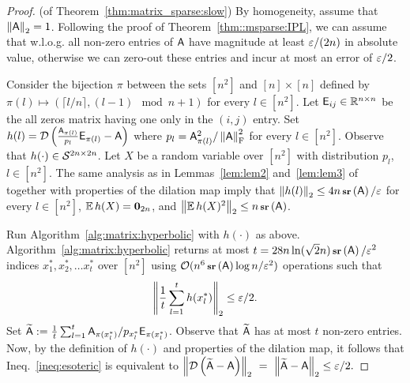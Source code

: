 \begin{proof}(of Theorem~\ref{thm:matrix_sparse:slow})
By homogeneity, assume that $\left\|{\mathsf{A} }\right\|_2 = 1$. Following the proof of Theorem~\ref{thm::msparse:IPL}, we can assume that w.l.o.g. all non-zero entries of ${\mathsf{A} }$ have magnitude at least $\varepsilon/(2n)$ in absolute value, otherwise we can zero-out these entries and incur at most an error of $\varepsilon/2$.
%

%
Consider the bijection $\pi$ between the sets $[n^2]$ and $[n]\times [n]$ defined by $\pi (l)  \mapsto ( \lceil l / n\rceil , (l - 1) \mod n + 1) $ for every $l\in[n^2]$. Let ${\mathsf{E} }_{ij}\in\mathbb{R}^{n\times n}$ be the all zeros matrix having one only in the $(i,j)$ entry. Set $h(l) = \mathcal{D}\left( \frac{{\mathsf{A} }_{\pi (l)}}{p_{l}} {\mathsf{E} }_{\pi (l)} - {\mathsf{A} } \right)$ where $p_l = {\mathsf{A} }_{\pi (l)}^2/\left\|{\mathsf{A} }\right\|_{\textrm{F}}^2$ for every $l\in{[n^2]}$. Observe that $h(\cdot ) \in \mathcal{S}^{2n\times 2n}$. Let $X$ be a random variable over $[n^2]$ with distribution $p_l$, $l\in{[n^2]}$. The same analysis as in Lemmas~\ref{lem:lem2} and~\ref{lem:lem3} of~\cite{matrix:sparsification:IPL2011} together with properties of the dilation map imply that $\left\|h(l)\right\|_2 \leq 4n\operatorname{\textbf{\footnotesize sr}}\left({\mathsf{A} }\right) /\varepsilon$ for every $l\in{[n^2]}$, $\operatorname{\mathbb{E}}{h(X)}=\mathbf{0}_{2n}$, and $\left\|\operatorname{\mathbb{E}} h(X)^2\right\|_2 \leq n\operatorname{\textbf{\footnotesize sr}}\left({\mathsf{A} }\right)$.

Run Algorithm~\ref{alg:matrix:hyperbolic} with $h(\cdot )$ as above. Algorithm~\ref{alg:matrix:hyperbolic} returns at most $t=28 n  \ln (\sqrt{2}n)\operatorname{\textbf{\footnotesize sr}}\left({\mathsf{A} }\right)/\varepsilon^2$ indices $x_1^*,x_2^*,\ldots x_t^*$ over $[n^2]$ using $\mathcal{O}(n^6 \operatorname{\textbf{\footnotesize sr}}\left({\mathsf{A} }\right) \log n /\varepsilon^2 )$ operations such that
	\begin{equation}\label{ineq:esoteric}
		\left\| \frac1{t}\sum_{l=1}^{t} h(x_l^*)\right\|_2 \leq \varepsilon / 2.
	\end{equation}
Set $\widetilde{{\mathsf{A} }} : = \frac1{t} \sum_{l=1}^{t} {\mathsf{A} }_{\pi (x_l^*)} /p_{x_l^*} {\mathsf{E} }_{\pi (x_l^*)}$. Observe that $\widetilde{{\mathsf{A} }}$ has at most $t$ non-zero entries. Now, by the definition of $h(\cdot)$ and properties of the  dilation map, it follows that Ineq.~\eqref{ineq:esoteric} is equivalent to $\norm{ \dil{\widetilde{\matA} - \matA }} \ =\ \norm{ \widetilde{\matA} - \matA } \leq \eps /2.$
\end{proof}
%
%
%
